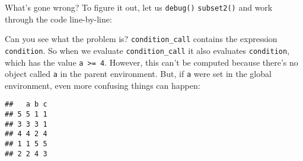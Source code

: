 What's gone wrong? To figure it out, let us \texttt{debug()}
\texttt{subset2()} and work through the code line-by-line:

\begin{Shaded}
\begin{Highlighting}[]
\OperatorTok{>=}\StringTok{ }\NormalTok{)}
\CommentTok{#> \}}
\StringTok{ }\NormalTok{())}
\end{Highlighting}
\end{Shaded}

Can you see what the problem is? \texttt{condition\_call} contains the
expression \texttt{condition}. So when we evaluate
\texttt{condition\_call} it also evaluates \texttt{condition}, which has
the value \texttt{a\ \textgreater{}=\ 4}. However, this can't be
computed because there's no object called \texttt{a} in the parent
environment. But, if \texttt{a} were set in the global environment, even
more confusing things can happen:

\begin{Shaded}
\begin{Highlighting}[]
\StringTok{ }
\OperatorTok{==}\StringTok{ }\NormalTok{)}
\end{Highlighting}
\end{Shaded}

\begin{verbatim}
##   a b c
## 5 5 1 1
## 3 3 3 1
## 4 4 2 4
## 1 1 5 5
## 2 2 4 3
\end{verbatim}

\begin{Shaded}
\begin{Highlighting}[]
\StringTok{ }\NormalTok{(}\NormalTok{, }\NormalTok{, }\NormalTok{, }\NormalTok{, }\NormalTok{, }\NormalTok{)}
\OperatorTok{>=}\StringTok{ }\NormalTok{)}
\end{Highlighting}
\end{Shaded}

